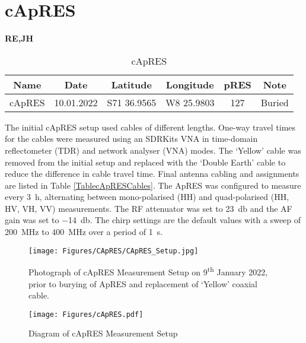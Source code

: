 \documentclass[a4paper,12pt]{article}
\begin{document}
\clearpage

\pagebreak
\section{cApRES}
\label{SeccApRES}
\textbf{RE,JH}\\

\begin{table}[H]
  \small
  \centering
  \begin{tabular}[width=\textwidth]{c c c c c c}
    \rowcolor{gray!50}
    Name & Date & Latitude & Longitude & pRES & Note\\
    \hline
    cApRES & 10.01.2022& S71 36.9565 & W8 25.9803 & 127 & Buried\\
    \hline
  \end{tabular}
  \caption{cApRES}
  \label{Table_cApRES}
\end{table}

The initial cApRES setup used cables of different lengths.  One-way travel times
for the cables were measured using an SDRKits VNA in time-domain reflectometer
(TDR) and network analyser (VNA) modes.  The `Yellow' cable was removed from the
initial setup and replaced with the `Double Earth' cable to reduce the
difference in cable travel time.  Final antenna cabling and assignments are
listed in Table \ref{TablecApRESCables}. 
The ApRES was configured to measure every \SI{3}{\hour}, alternating between 
mono-polarised (HH) and quad-polarised (HH, HV, VH, VV) measurements.  The RF
attenuator was set to \SI{23}{\decibel} and the AF gain was set to 
\SI{-14}{\decibel}.  The chirp settings are the default values with a sweep of
\SI{200}{\mega\hertz} to \SI{400}{\mega\hertz} over a period of \SI{1}{\second}.

\begin{figure}[H]
  \centering
  \texttt{[image: Figures/CApRES/CApRES\_Setup.jpg]}
  \caption{Photograph of cApRES Measurement Setup on 9\textsuperscript{th}
  January 2022, prior to burying of ApRES and replacement of `Yellow' coaxial
  cable.}
  \label{FigCApRESSetupImage}
\end{figure}

\begin{figure}[H]
  \texttt{[image: Figures/cApRES.pdf]}
  \caption{Diagram of cApRES Measurement Setup}
  \label{fig_cApRES}
\end{figure}
\end{document}
